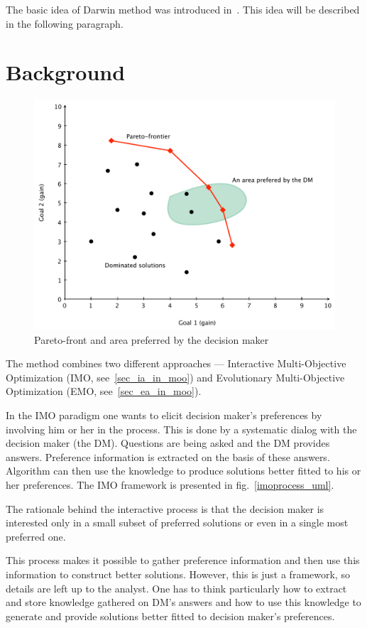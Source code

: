 The basic idea of Darwin method was introduced in~\cite{GMS09}. This idea will
be described in the following paragraph.

\section{Background}

\begin{figure}
  \centering \includegraphics[scale=0.65]{img/pareto}
  \caption{Pareto-front and area preferred by the decision maker}
  \label{pareto}
\end{figure}

The method combines two different approaches --- Interactive Multi-Objective
Optimization (IMO, see~\ref{sec_ia_in_moo}) and Evolutionary Multi-Objective
Optimization (EMO, see~\ref{sec_ea_in_moo}).

In the IMO paradigm one wants to elicit decision maker's preferences by
involving him or her in the process. This is done by a systematic dialog with
the decision maker (the DM). Questions are being asked and the DM provides
answers. Preference information is extracted on the basis of these
answers. Algorithm can then use the knowledge to produce solutions better
fitted to his or her preferences. The IMO framework is presented in
fig.~\ref{imoprocess_uml}.

The rationale behind the interactive process is that the decision maker is
interested only in a small subset of preferred solutions or even in a single
most preferred one.

This process makes it possible to gather preference information and then use
this information to construct better solutions. However, this is just a
framework, so details are left up to the analyst. One has to think
particularly how to extract and store knowledge gathered on DM's answers and
how to use this knowledge to generate and provide solutions better fitted to
decision maker's preferences.

